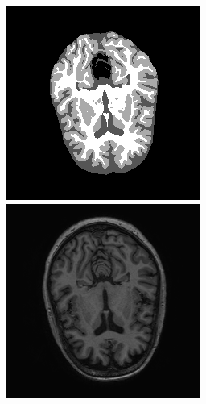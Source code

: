 \documentclass[runningheads,a4paper]{llncs}
\begin{document}
\begin{figure}
 \centering
 \begin{minipage}{.24\textwidth}
 \includegraphics[width=.99\linewidth]{./images/sl19-v5-test-challres_new.png}
 \end{minipage}
  \begin{minipage}{.24\textwidth}
 \includegraphics[width=.99\linewidth]{./images/sl19-v5-test-t1.png}

\end{minipage}
\end{figure}
\end{document}
